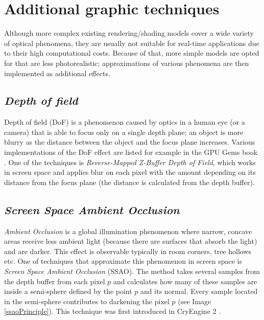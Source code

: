\section{Additional graphic techniques}
Although more complex existing rendering/shading models cover a wide variety of optical phenomena, they are usually not suitable for real-time applications due to their high computational costs. Because of that, more simple models are opted for that are less photorealistic; approximations of various phenomena are then implemented as additional effects.

\subsection{\textit{Depth of field}} \label{dof}
Depth of field (DoF) is a phenomenon caused by optics in a human eye (or a camera) that is able to focus only on a single depth plane; an object is more blurry as the distance between the object and the focus plane increases. Various implementations of the DoF effect are listed for example in the GPU Gems book \cite{FernandoR2004Gg}. One of the techniques is \textit{Reverse-Mapped Z-Buffer Depth of Field}, which works in screen space and applies blur on each pixel with the amount depending on its distance from the focus plane (the distance is calculated from the depth buffer).

\subsection{\textit{Screen Space Ambient Occlusion}}
\textit{Ambient Occlusion} is a global illumination phenomenon where narrow, concave areas receive less ambient light (because there are surfaces that absorb the light) and are darker. This effect is observable typically in room corners, tree hollows etc. One of techniques that approximate this phenomenon in screen space is \textit{Screen Space Ambient Occlusion} (SSAO). The method takes several samples from the depth buffer from each pixel $p$ and calculates how many of these samples are inside a semi-sphere defined by the point $p$ and its normal. Every sample located in the semi-sphere contributes to darkening the pixel $p$ (see Image \ref{ssaoPrinciple}). This technique was first introduced in CryEngine 2 \cite{Mittring:2007:FNG:1281500.1281671}.

